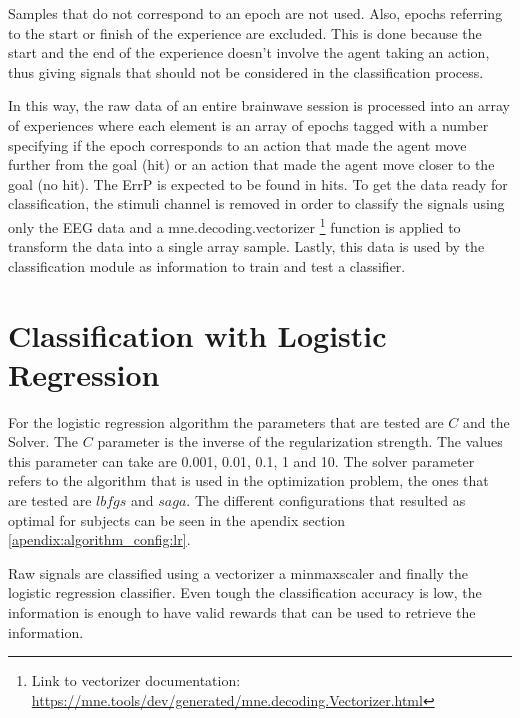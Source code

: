 \documentclass[journal]{IEEEtran}
\begin{document}
Samples that do not correspond to an epoch are not used. Also, epochs referring to the start or finish of the experience are excluded. This is done because the start and the end of the experience doesn't involve the agent taking an action, thus giving signals that should not be considered in the classification process.

In this way, the raw data of an entire brainwave session is processed into an array of experiences where each element is an array of epochs tagged with a number specifying if the epoch corresponds to an action that made the agent move further from the goal (hit) or an action that made the agent move closer to the goal (no hit). The ErrP is expected to be found in hits. To get the data ready for classification, the stimuli channel is removed in order to classify the signals using only the EEG data and a mne.decoding.vectorizer \footnote{Link to vectorizer documentation: \href{https://mne.tools/dev/generated/mne.decoding.Vectorizer.html}{https://mne.tools/dev/generated/mne.decoding.Vectorizer.html}} function is applied to transform the data into a single array sample. Lastly, this data is used by the classification module as information to train and test a classifier.

\section{Classification with Logistic Regression}
For the logistic regression algorithm the parameters that are tested are $C$ and the Solver.  The $C$ parameter is the inverse of the regularization strength. The values this parameter can take are 0.001, 0.01, 0.1, 1 and 10. The solver parameter refers to the algorithm that is used in the optimization problem, the ones that are tested are $lbfgs$ and $saga$. The different configurations that resulted as optimal for subjects can be seen in the apendix section \ref{apendix:algorithm_config:lr}.

Raw signals are classified using a vectorizer a minmaxscaler and finally the logistic regression classifier.  Even tough the classification accuracy is low, the information is enough to have valid rewards that can be used to retrieve the information.
\end{document}
